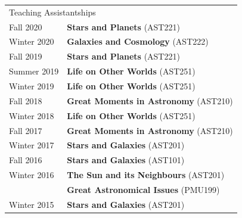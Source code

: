 \documentclass[10pt]{res} %
\begin{document}
\begin{resume}
\begin{table}[h!]
\begin{tabularx}{\textwidth}{ @{} p{6.5em} X @{} }
% 
% 
\multicolumn{2}{l}{ \rule{0pt}{3ex} \large \hspace{-12pt} Teaching Assistantships \dotfill \rule[-1.2ex]{0pt}{0pt}} \\
Fall 2020      & \textbf{Stars and Planets} (AST221) \\
Winter 2020  & \textbf{Galaxies and Cosmology} (AST222) \\
Fall 2019      & \textbf{Stars and Planets} (AST221) \\
Summer 2019 & \textbf{Life on Other Worlds} (AST251) \\
Winter 2019 & \textbf{Life on Other Worlds} (AST251) \\
Fall 2018      & \textbf{Great Moments in Astronomy} (AST210) \\
Winter 2018 & \textbf{Life on Other Worlds} (AST251) \\
Fall 2017      & \textbf{Great Moments in Astronomy} (AST210) \\
Winter 2017 & \textbf{Stars and Galaxies} (AST201) \\
Fall 2016 & \textbf{Stars and Galaxies} (AST101) \\
Winter 2016  & \textbf{The Sun and its Neighbours} (AST201) \\
                     & \textbf{Great Astronomical Issues} (PMU199) \\
Winter 2015 & \textbf{Stars and Galaxies} (AST201)
\end{tabularx}
\end{table}




\end{resume}
\end{document}
